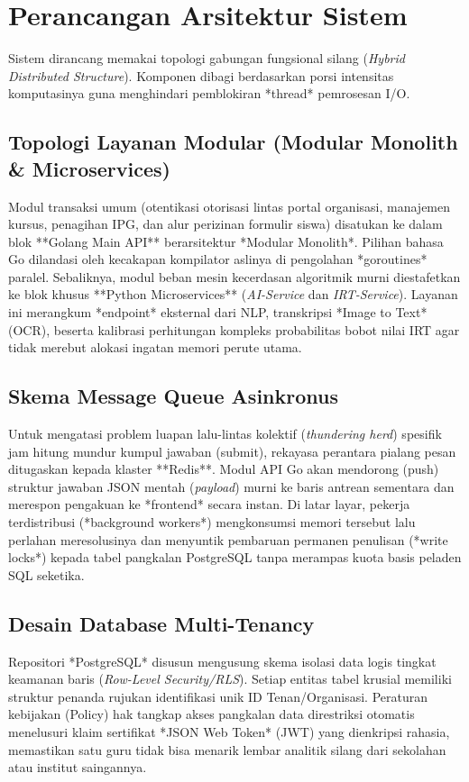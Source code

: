 \section{Perancangan Arsitektur Sistem}

Sistem dirancang memakai topologi gabungan fungsional silang (\textit{Hybrid Distributed Structure}). Komponen dibagi berdasarkan porsi intensitas komputasinya guna menghindari pemblokiran *thread* pemrosesan I/O.

\subsection{Topologi Layanan Modular (Modular Monolith \& Microservices)}
Modul transaksi umum (otentikasi otorisasi lintas portal organisasi, manajemen kursus, penagihan IPG, dan alur perizinan formulir siswa) disatukan ke dalam blok **Golang Main API** berarsitektur *Modular Monolith*. Pilihan bahasa Go dilandasi oleh kecakapan kompilator aslinya di pengolahan *goroutines* paralel.
Sebaliknya, modul beban mesin kecerdasan algoritmik murni diestafetkan ke blok khusus **Python Microservices** (\textit{AI-Service} dan \textit{IRT-Service}). Layanan ini merangkum *endpoint* eksternal dari NLP, transkripsi *Image to Text* (OCR), beserta kalibrasi perhitungan kompleks probabilitas bobot nilai IRT agar tidak merebut alokasi ingatan memori perute utama.

\subsection{Skema Message Queue Asinkronus}
Untuk mengatasi problem luapan lalu-lintas kolektif (\textit{thundering herd}) spesifik jam hitung mundur kumpul jawaban (submit), rekayasa perantara pialang pesan ditugaskan kepada klaster **Redis**. Modul API Go akan mendorong (push) struktur jawaban JSON mentah (\textit{payload}) murni ke baris antrean sementara dan merespon pengakuan ke *frontend* secara instan. Di latar layar, pekerja terdistribusi (*background workers*) mengkonsumsi memori tersebut lalu perlahan meresolusinya dan menyuntik pembaruan permanen penulisan (*write locks*) kepada tabel pangkalan PostgreSQL tanpa merampas kuota basis peladen SQL seketika.

\subsection{Desain Database Multi-Tenancy}
Repositori *PostgreSQL* disusun mengusung skema isolasi data logis tingkat keamanan baris (\textit{Row-Level Security/RLS}). Setiap entitas tabel krusial memiliki struktur penanda rujukan identifikasi unik ID Tenan/Organisasi. Peraturan kebijakan (Policy) hak tangkap akses pangkalan data direstriksi otomatis menelusuri klaim sertifikat *JSON Web Token* (JWT) yang dienkripsi rahasia, memastikan satu guru tidak bisa menarik lembar analitik silang dari sekolahan atau institut saingannya.

